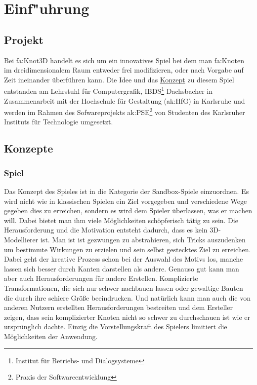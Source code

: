 %
%


\chapter{Einf{"u}hrung}
\label{EF}


\section{Projekt}

Bei \gls{fa:Knot3D} handelt es sich um ein innovatives Spiel bei dem man \gls{fa:Knoten} im dreidimensionalem Raum entweder frei modifizieren, oder nach Vorgabe auf Zeit ineinander überführen kann.
Die Idee und das \hyperlink{EF:Spielkonzept}{Konzept} zu diesem Spiel entstanden am Lehrstuhl für Computergrafik, IBDS\footnote{Institut für Betriebs- und Dialogsysteme} Dachsbacher in Zusammenarbeit mit der Hochschule für Gestaltung (\gls{ak:HfG}) in Karlsruhe und werden im Rahmen des Sofwareprojekts \gls{ak:PSE}\footnote{Praxis der Softwareentwicklung} von Studenten des Karlsruher Instituts für Technologie umgesetzt.


\section{Konzepte}
\label{EF:Konzepte}

\subsection{Spiel}
\label{EF:Spielkonzept}

Das Konzept des Spieles ist in die Kategorie der Sandbox-Spiele einzuordnen. Es wird nicht wie in klassischen Spielen ein Ziel vorgegeben und verschiedene Wege gegeben dies zu erreichen, sondern es wird dem Spieler überlassen, was er machen will. Dabei bietet man ihm viele Möglichkeiten schöpferisch tätig zu sein. Die Herausforderung und die Motivation entsteht dadurch, dass es kein 3D-Modellierer ist. Man ist ist gezwungen zu abstrahieren, sich Tricks auszudenken um bestimmte Wirkungen zu erzielen und sein selbst gestecktes Ziel zu erreichen. Dabei geht der kreative Prozess schon bei der Auswahl des Motivs los, manche lassen sich besser durch Kanten darstellen als andere.
Genauso gut kann man aber auch Herausforderungen für andere Erstellen. Komplizierte Transformationen, die sich nur schwer nachbauen lassen oder gewaltige Bauten die durch ihre schiere Größe beeindrucken. Und natürlich kann man auch die von anderen Nutzern erstellten Herausforderungen bestreiten und dem Ersteller zeigen, dass sein komplizierter Knoten nicht so schwer zu durchschauen ist wie er ursprünglich dachte.
Einzig die Vorstellungskraft des Spielers limitiert die Möglichkeiten der Anwendung.


